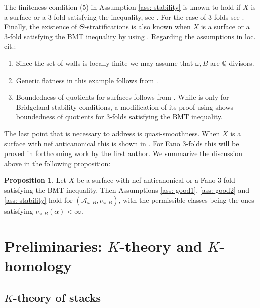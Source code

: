 \documentclass[12pt]{amsart}
\theoremstyle{definition}
\newtheorem{proposition}[definition]{Proposition}
\newcommand{\BQ}{{\mathbb{Q}}}
\newcommand{\CA}{{\mathcal A}}
\newcommand{\1}{\mathbf 1}
\begin{document}
The finiteness condition (5) in Assumption \ref{ass: stability} is known to hold if $X$ is a surface or a 3-fold satisfying the \cite{BMTbogomolov} inequality, see \cite[Conjecture 4.1]{BMS}. For the case of 3-folds see \cite[Proposition 4.1]{FTr0}. Finally, the existence of $\Theta$-stratifications is also known when $X$ is a surface or a 3-fold satisfying the BMT inequality by using \cite[Theorem 6.5.3]{HLstructure}. Regarding the assumptions in loc. cit.:
\begin{enumerate}
    \item Since the set of walls is locally finite \cite[Proposition 12.5]{BMS} we may assume that $\omega, B$ are $\BQ$-divisors.
    \item Generic flatness in this example follows from \cite[Proposition 4.11]{PiyToda}.
    \item Boundedness of quotients for surfaces follows from \cite[Proposition~3.15]{todaK3}.  While \cite[Proposition~3.15]{todaK3} is only for Bridgeland stability conditions, a modification of its proof using \cite[Theorem C.5]{FTr0} shows boundedness of quotients for 3-folds satisfying the BMT inequality.
\end{enumerate}

The last point that is necessary to address is quasi-smoothness. When $X$ is a surface with nef anticanonical this is shown in \cite[Lemma 7.8]{lmquivers}. For Fano 3-folds this will be proved in forthcoming work by the first author. We summarize the discussion above in the following proposition:

\begin{proposition}\label{prop: tilt}
Let $X$ be a surface with nef anticanonical or a Fano 3-fold satisfying the BMT inequality. Then Assumptions \ref{ass: good1}, \ref{ass: good2} and \ref{ass: stability} hold for $(\CA_{\omega, B}, \nu_{\omega, B})$, with the permissible classes being the ones satisfying $\nu_{\omega, B}(\alpha)<\infty$. 
\end{proposition}

\section{Preliminaries: $K$-theory and $K$-homology}
\label{sec: Khomology}

\subsection{$K$-theory of stacks}
\label{subsec: Ktheorystacks}
\end{document}
